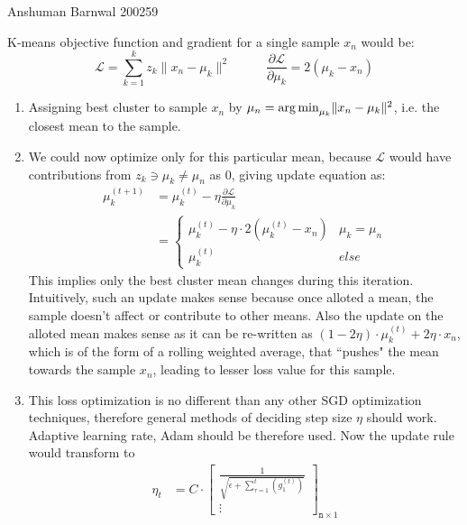 \documentclass[a4paper,11pt]{article}
\begin{document}
{Anshuman Barnwal}   %
{200259}	%

\begin{mlsolution}

K-means objective function and gradient for a single sample $x_n$ would be:
\[
    \mathcal{L} = \sum_{k=1}^{k} z_k \lVert x_n - \mu_k \rVert^2\;\;\;\;\;\;\;\;\;\;
    \frac{\partial \mathcal{L}}{\partial \mu_k} = 2(\mu_k - x_n)
\]
\begin{enumerate}
\item 
    Assigning best cluster to sample $x_n$ by $\mu_n = \mathop{\arg\min}_{\mu_k} \lVert x_n - \mu_k \rVert^2$, i.e. the closest mean to the sample.
\item 
    We could now optimize only for this particular mean, because $\mathcal{L}$ would have contributions from $z_k \ni \mu_k\neq\mu_n$ as $0$, giving update equation as:
    \begin{align*}
        \mu_k^{(t+1)} &= \mu_k^{(t)} - \eta \frac{\partial\mathcal{L}}{\partial\mu_k} \\
        &= \begin{cases}
            \mu_k^{(t)} - \eta \cdot 2 (\mu_k^{(t)} - x_n) & \mu_k = \mu_n \\
            \mu_k^{(t)} & else
        \end{cases}
    \end{align*}
    This implies only the best cluster mean changes during this iteration. Intuitively, such an update makes sense because once alloted a mean, the sample doesn't affect or contribute to other means. Also the update on the alloted mean makes sense as it can be re-written as $(1 - 2\eta)\cdot\mu_k^{(t)} + 2\eta\cdot x_n$, which is of the form of a rolling weighted average, that ``pushes" the mean towards the sample $x_n$, leading to lesser loss value for this sample.
\item
    This loss optimization is no different than any other SGD optimization techniques, therefore general methods of deciding step size $\eta$ should work. Adaptive learning rate, Adam should be therefore used. Now the update rule would transform to
    \begin{align*}
        \eta_t &= C \cdot \begin{bmatrix}
            \frac{1}{\sqrt{\epsilon + \sum_{\tau=1}^{t} (g_1^{(t)})}} \\
            \vdots
        \end{bmatrix}_{\texttt{n} \times 1} \\

\end{align*}
\end{enumerate}
\end{mlsolution}
\end{document}
